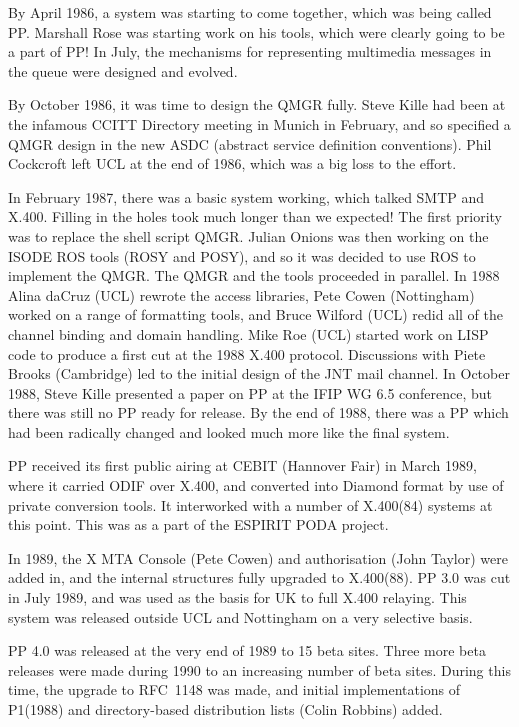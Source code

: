 By April 1986, a system was starting to come together, which was being
called PP.  Marshall Rose was starting work on his  tools, which
were clearly going to be a part of PP!  In July, the mechanisms for
representing multimedia messages in the queue were designed and
evolved.

By October 1986, it was time to design the QMGR fully.  Steve Kille had been
at the infamous CCITT Directory meeting in Munich in February, and so
specified a QMGR design in the new ASDC (abstract service definition
conventions).  Phil Cockcroft left UCL at the end of 1986, which was a big
loss to the effort.

In February 1987, there was a basic system working, which talked SMTP
and X.400.  Filling in the holes took much longer than we expected!
The first priority was to replace the shell script QMGR.  Julian
Onions was then working on the ISODE ROS tools (ROSY and POSY), and so
it was decided to use ROS to implement the QMGR.  The QMGR and the
tools proceeded in parallel.  In 1988 Alina daCruz (UCL) rewrote the
access libraries, Pete Cowen (Nottingham) worked on a range of
formatting tools, and Bruce Wilford (UCL) redid all of the channel
binding and domain handling.  Mike Roe (UCL) started work on LISP code
to produce a first cut at the 1988 X.400 protocol.  Discussions with
Piete Brooks (Cambridge) led to the initial design of the JNT mail
channel.  In October 1988, Steve Kille presented a paper on PP at the
IFIP WG 6.5 conference, but there was still no PP ready for release.
By the end of 1988, there was a PP which had been radically changed
and looked much more like the final system.


PP received its first public airing at CEBIT (Hannover Fair) in March 1989,
where it carried ODIF over X.400, and converted into Diamond format by
use of private conversion tools.  It interworked with a number of
X.400(84) systems at this point.  This was as a part of the ESPIRIT
PODA project.


In 1989, the X MTA Console (Pete Cowen) and authorisation (John
Taylor) were added in, and the internal structures fully upgraded to
X.400(88).  PP 3.0 was cut in July 1989, and was used as the basis for
UK to full X.400 relaying.  This system was released outside UCL and
Nottingham on a very selective basis.

PP 4.0 was released at the very end of 1989 to 15 beta sites.  Three more
beta releases were made during 1990 to an increasing number of beta sites.
During this time, the upgrade to RFC~1148 was made, and initial
implementations of P1(1988) and directory-based distribution lists (Colin
Robbins) added.

